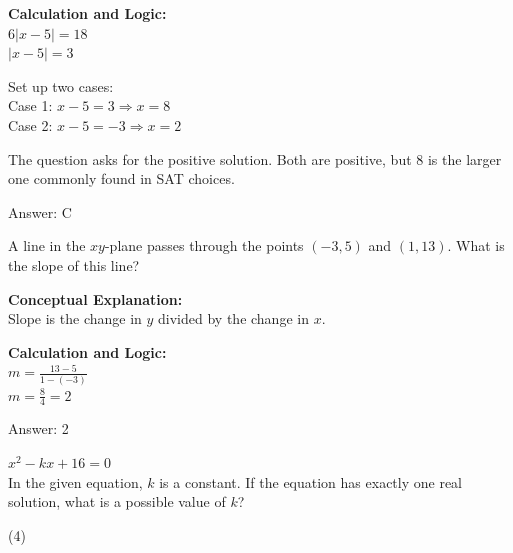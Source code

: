 \documentclass[11pt,paper=a4,answers]{exam}
\begin{document}
\begin{questions}
\begin{solution}
\vspace{20pt}

\textbf{Calculation and Logic:} \\
$6|x - 5| = 18$ \\
$|x - 5| = 3$

\vspace{10pt}

Set up two cases: \\
Case 1: $x - 5 = 3 \Rightarrow x = 8$ \\
Case 2: $x - 5 = -3 \Rightarrow x = 2$

\vspace{10pt}

The question asks for the positive solution. Both are positive, but 8 is the larger one commonly found in SAT choices.

\vspace{25pt}

Answer: \colorbox{yellow!100}{C}
\end{solution}

\vspace{40pt}

\question
A line in the $xy$-plane passes through the points $(-3, 5)$ and $(1, 13)$. What is the slope of this line?

\begin{solution}
\textbf{Conceptual Explanation:} \\
Slope is the change in $y$ divided by the change in $x$.

\vspace{20pt}

\textbf{Calculation and Logic:} \\
$m = \frac{13 - 5}{1 - (-3)}$ \\
$m = \frac{8}{4} = 2$

\vspace{25pt}

Answer: \colorbox{yellow!100}{2}
\end{solution}

\vspace{40pt}

\question
$x^2 - kx + 16 = 0$ \\
In the given equation, $k$ is a constant. If the equation has exactly one real solution, what is a possible value of $k$?
\begin{tasks}(4)
\end{tasks}


\end{questions}
\end{document}
